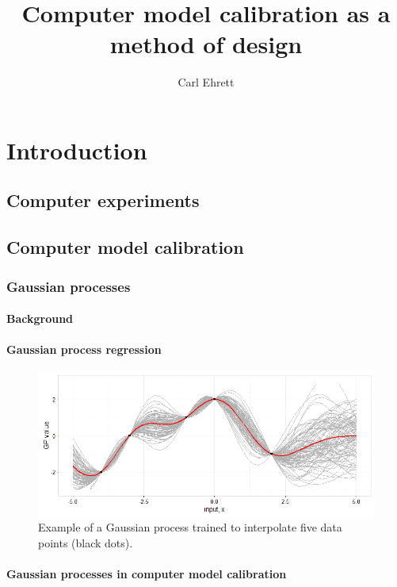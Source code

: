 \documentclass{article}
\author{Carl Ehrett}
\title{Computer model calibration as a method of design}
\begin{document}
\maketitle

\section{Introduction}

\subsection{Computer experiments}

\subsection{Computer model calibration}

\subsubsection{Gaussian processes}

\paragraph{Background}



\paragraph{Gaussian process regression}

\begin{figure}[h]
\centering
\includegraphics[width=.75\linewidth]{gp_example}
\caption{Example of a Gaussian process trained to interpolate five data points (black dots).}
\label{gp_example}
\end{figure}

\paragraph{Gaussian processes in computer model calibration}
\end{document}

